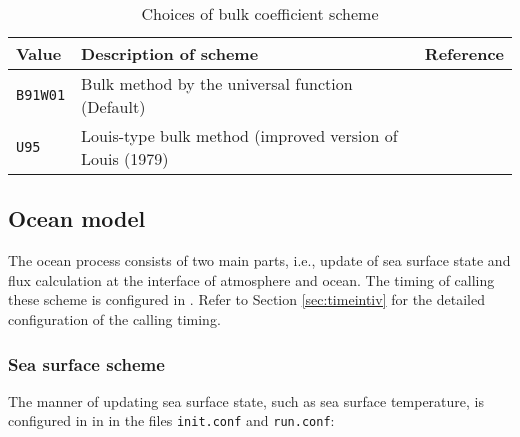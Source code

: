 \begin{table}[h]
\begin{center}
  \caption{Choices of bulk coefficient scheme}
  \label{tab:nml_bulk}
  \begin{tabularx}{150mm}{llX} \hline
    \rowcolor[gray]{0.9}  Value & Description of scheme & Reference\\ \hline
      \verb|B91W01| & Bulk method by the universal function (Default) & \citet{beljaars_1991,wilson_2001} \\
      \verb|U95|    & Louis-type bulk method  (improved version of Louis (1979) & \citet{uno_1995} \\
    \hline
  \end{tabularx}
\end{center}
\end{table}

\subsection{Ocean model} \label{subsecp:basic_usel_ocean}
The ocean process consists of two main parts, i.e., update of sea surface state and flux calculation at the interface of atmosphere and ocean. The timing of calling these scheme is configured in . Refer to Section \ref{sec:timeintiv} for the detailed configuration of the calling timing.

\subsubsection{Sea surface scheme}
The manner of updating sea surface state, such as sea surface temperature, is configured in  in  in the files \verb|init.conf| and \verb|run.conf|:

